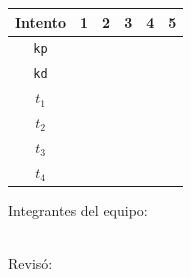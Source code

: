 \begin{enumerate}
		\begin{center}
			\begin{tabular}{|c|c|c|c|c|c|}
				 \hline
				 Intento & 1 & 2 & 3 & 4 & 5 \\
				 \hline
				 \texttt{kp} & \hspace{1.7cm} & \hspace{1.7cm} & \hspace{1.7cm} & \hspace{1.7cm} & \hspace{1.7cm} \\
				 \hline
				 \texttt{kd} & \hspace{1.7cm} & \hspace{1.7cm} & \hspace{1.7cm} & \hspace{1.7cm} & \hspace{1.7cm} \\
				 \hline
				 $t_1$ & & & & & \\
				 \hline
				 $t_2$ & & & & & \\
				 \hline
				 $t_3$ & & & & & \\
				 \hline
				 $t_4$ & & & & & \\
				 \hline
			\end{tabular}
		\end{center}

	\end{enumerate}

	\begin{multicols}{2}
		Integrantes del equipo: \\[0.4cm]
		\horrule{0.5pt} \\[0.4cm] %
		\horrule{0.5pt} %

		Revisó: \\[1.25cm]
		\horrule{0.5pt} \\%
	\end{multicols}



